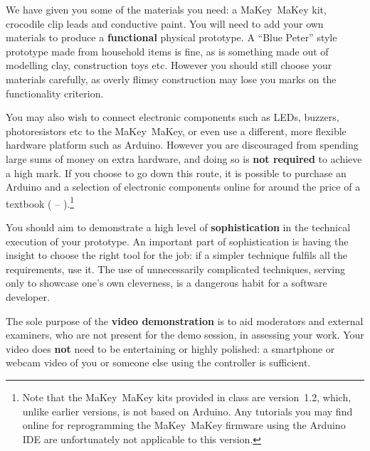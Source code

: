 \documentclass{../fal_assignment}
\begin{document}
We have given you some of the materials you need: a MaKey~MaKey kit, crocodile clip leads and conductive paint.
You will need to add your own materials to produce a \textbf{functional} physical prototype.
A ``Blue Peter'' style prototype made from household items is fine,
as is something made out of modelling clay, construction toys etc.
However you should still choose your materials carefully, as overly flimsy construction may
lose you marks on the functionality criterion.

You may also wish to connect electronic components such as LEDs, buzzers, photoresistors etc to the MaKey~MaKey,
or even use a different, more flexible hardware platform such as Arduino.
However you are discouraged from spending large sums of money on extra hardware,
and doing so is \textbf{not required} to achieve a high mark.
If you choose to go down this route,
it is possible to purchase an Arduino and a selection of electronic components online for 
around the price of a textbook ( -- ).\footnote{
    Note that the MaKey~MaKey kits provided in class are version~1.2, which, unlike earlier versions, is not based on Arduino.
    Any tutorials you may find online for reprogramming the MaKey~MaKey firmware using the Arduino IDE
    are unfortunately not applicable to this version.
}

You should aim to demonstrate a high level of \textbf{sophistication}
in the technical execution of your prototype.
An important part of sophistication is having the insight to choose the right tool for the job:
if a simpler technique fulfils all the requirements, use it.
The use of unnecessarily complicated techniques, serving only to showcase one's own cleverness,
is a dangerous habit for a software developer.

The sole purpose of the \textbf{video demonstration} is to aid moderators and external examiners,
who are not present for the demo session,
in assessing your work.
Your video does \textbf{not} need to be entertaining or highly polished:
a smartphone or webcam video of you or someone else using the controller is sufficient.

%
\end{document}
